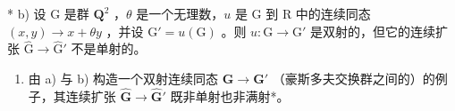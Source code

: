 * b) 设 G 是群 \(\mathbf{Q}^2\) ，\(\theta\) 是一个无理数，\(u\) 是 G 到 R 中的连续同态 \((x,y)\to x + \theta y\) ，并设 \(\mathrm{G}' = u(\mathrm{G})\) 。则 \(u: \mathrm{G}\to \mathrm{G}'\) 是双射的，但它的连续扩张 \(\hat{\mathrm{G}}\to \hat{\mathrm{G}}'\) 不是单射的。

\begin{enumerate}
\def\labelenumi{\alph{enumi})}
\setcounter{enumi}{2}
\tightlist
\item
  由 a) 与 b) 构造一个双射连续同态 \(\mathbf{G} \to \mathbf{G}'\) （豪斯多夫交换群之间的）的例子，其连续扩张 \(\hat{\mathbf{G}} \to \hat{\mathbf{G}}'\) 既非单射也非满射*。
\end{enumerate}

